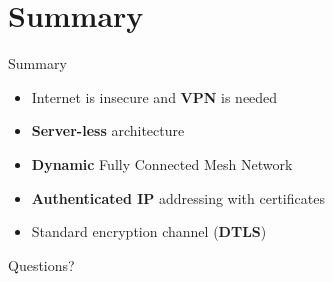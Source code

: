 \documentclass{beamer}
\begin{document}
\section*{Summary}
\begin{frame}{Summary}
	\begin{itemize}
	\item Internet is \alert{insecure} and \textbf{VPN} is needed
	\item \textbf{Server-less} architecture
	\item \textbf{Dynamic} Fully Connected Mesh Network
	\item \textbf{Authenticated IP} addressing with certificates
	\item Standard encryption channel (\textbf{DTLS})
	\end{itemize}
\end{frame}

\begin{frame}
\begin{center}
Questions?
\end{center}
\end{frame}
\end{document}
